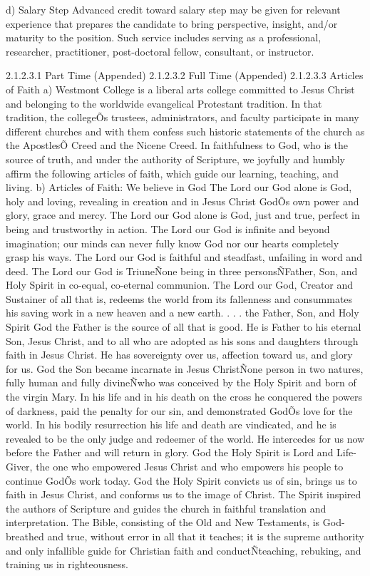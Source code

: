 \documentclass[letterpaper, 11pt]{article}
\begin{document}
	d)	Salary Step Advanced credit toward salary step may be given for relevant experience that prepares the candidate to bring perspective, insight, and/or maturity to the position.  Such service includes serving as a professional, researcher, practitioner, post-doctoral fellow, consultant, or instructor.

	2.1.2.3.1 Part Time (Appended)
	2.1.2.3.2 Full Time (Appended)
	2.1.2.3.3 Articles of Faith
	a) Westmont College is a liberal arts college committed to Jesus Christ and belonging to the worldwide evangelical Protestant tradition.  In that tradition, the collegeÕs trustees, administrators, and faculty participate in many different churches and with them confess such historic statements of the church as the ApostlesÕ Creed and the Nicene Creed. In faithfulness to God, who is the source of truth, and under the authority of Scripture, we joyfully and humbly affirm the following articles of faith, which guide our learning, teaching, and living.
	b) Articles of Faith:
	We believe in God
	The Lord our God alone is God, holy and loving, revealing in creation and in Jesus Christ GodÕs own power and glory, grace and mercy. The Lord our God alone is God, just and true, perfect in being and trustworthy in action.
	The Lord our God is infinite and beyond imagination; our minds can never fully know God nor our hearts completely grasp his ways. The Lord our God is faithful and steadfast, unfailing in word and deed.
	The Lord our God is TriuneÑone being in three personsÑFather, Son, and Holy Spirit in co-equal, co-eternal communion. The Lord our God, Creator and Sustainer of all that is, redeems the world from its fallenness and consummates his saving work in a new heaven and a new earth.
	. . . the Father, Son, and Holy Spirit
	God the Father is the source of all that is good. He is Father to his eternal Son, Jesus Christ, and to all who are adopted as his sons and daughters through faith in Jesus Christ. He has sovereignty over us, affection toward us, and glory for us.
	God the Son became incarnate in Jesus ChristÑone person in two natures, fully human and fully divineÑwho was conceived by the Holy Spirit and born of the virgin Mary. In his life and in his death on the cross he conquered the powers of darkness, paid the penalty for our sin, and demonstrated GodÕs love for the world.  In his bodily resurrection his life and death are vindicated, and he is revealed to be the only judge and redeemer of the world. He intercedes for us now before the Father and will return in glory.
	God the Holy Spirit is Lord and Life-Giver, the one who empowered Jesus Christ and who empowers his people to continue GodÕs work today. God the Holy Spirit convicts us of sin, brings us to faith in Jesus Christ, and conforms us to the image of Christ. The Spirit inspired the authors of  Scripture and guides the church in faithful translation and interpretation. The Bible, consisting of the Old and New Testaments, is God-breathed and true, without error in all that it teaches; it is the supreme authority and only infallible guide for Christian faith and conductÑteaching, rebuking, and training us in righteousness.
\end{document}
